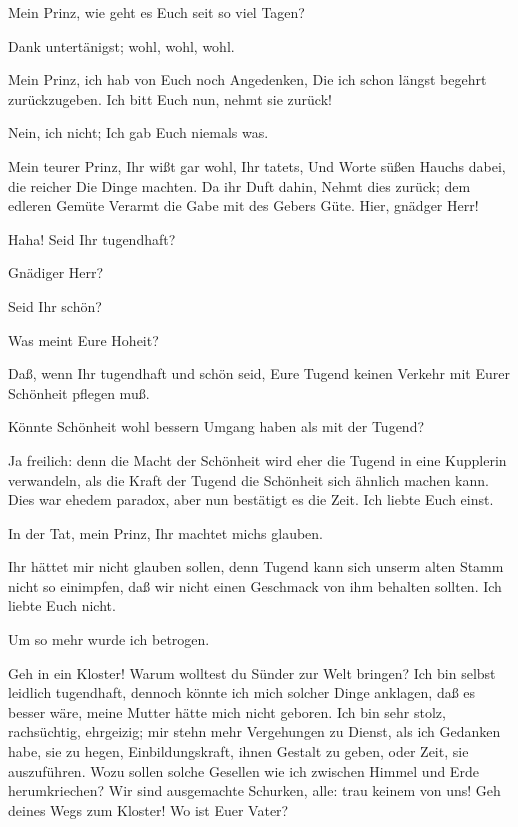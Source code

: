Mein Prinz, wie geht es Euch seit so viel Tagen?

Dank untertänigst; wohl, wohl, wohl.

Mein Prinz, ich hab von Euch noch Angedenken,
Die ich schon längst begehrt zurückzugeben.
Ich bitt Euch nun, nehmt sie zurück!

Nein, ich nicht;
Ich gab Euch niemals was.

Mein teurer Prinz, Ihr wißt gar wohl, Ihr tatets,
Und Worte süßen Hauchs dabei, die reicher
Die Dinge machten. Da ihr Duft dahin,
Nehmt dies zurück; dem edleren Gemüte
Verarmt die Gabe mit des Gebers Güte.
Hier, gnädger Herr!

Haha! Seid Ihr tugendhaft?

Gnädiger Herr?

Seid Ihr schön?

Was meint Eure Hoheit?

Daß, wenn Ihr tugendhaft und schön seid, Eure Tugend keinen Verkehr mit Eurer
Schönheit pflegen muß.

Könnte Schönheit wohl bessern Umgang haben als mit der Tugend?

Ja freilich: denn die Macht der Schönheit wird eher die Tugend in eine
Kupplerin verwandeln, als die Kraft der Tugend die Schönheit sich ähnlich
machen kann. Dies war ehedem paradox, aber nun bestätigt es die Zeit. Ich
liebte Euch einst.

In der Tat, mein Prinz, Ihr machtet michs glauben.

Ihr hättet mir nicht glauben sollen, denn Tugend kann sich unserm alten Stamm
nicht so einimpfen, daß wir nicht einen Geschmack von ihm behalten sollten. Ich
liebte Euch nicht.

Um so mehr wurde ich betrogen.

Geh in ein Kloster! Warum wolltest du Sünder zur Welt bringen? Ich bin selbst
leidlich tugendhaft, dennoch könnte ich mich solcher Dinge anklagen, daß es
besser wäre, meine Mutter hätte mich nicht geboren. Ich bin sehr stolz,
rachsüchtig, ehrgeizig; mir stehn mehr Vergehungen zu Dienst, als ich Gedanken
habe, sie zu hegen, Einbildungskraft, ihnen Gestalt zu geben, oder Zeit, sie
auszuführen. Wozu sollen solche Gesellen wie ich zwischen Himmel und Erde
herumkriechen? Wir sind ausgemachte Schurken, alle: trau keinem von uns! Geh
deines Wegs zum Kloster! Wo ist Euer Vater?

